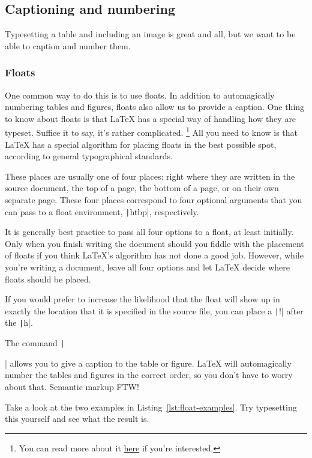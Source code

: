 \subsection{Captioning and numbering}
\label{subsec:captioning-and-numbering}

Typesetting a table and including an image is great and all, but we want to be able to caption and number them.

\subsubsection{Floats}
\label{subsubsec:floats}

One common way to do this is to use floats.
In addition to automagically numbering tables and figures, floats also allow us to provide a caption.
One thing to know about floats is that \LaTeX{} has a special way of handling how they are typeset.
Suffice it to say, it's rather complicated.%
\footnote{%
You can read more about it \href{http://tex.stackexchange.com/q/39017/32888}{here} if you're interested.%
}
All you need to know is that \LaTeX{} has a special algorithm for placing floats in the best possible spot, according to general typographical standards.

These places are usually one of four places: right where they are written in the source document, the top of a page, the bottom of a page, or on their own separate page.
These four places correspond to four optional arguments that you can pass to a float environment, \texttt|htbp|, respectively.

It is generally best practice to pass all four options to a float, at least initially.
Only when you finish writing the document should you fiddle with the placement of floats if you think \LaTeX's algorithm has not done a good job.
However, while you're writing a document, leave all four options and let \LaTeX{} decide where floats should be placed.

If you would prefer to increase the likelihood that the float will show up in exactly the location that it is specified in the source  file, you can place a \texttt|!| after the \texttt|h|.

The command \texttt|\caption{}| allows you to give a caption to the table or figure.
\LaTeX{} will automagically number the tables and figures in the correct order, so you don't have to worry about that.
Semantic markup FTW!

Take a look at the two examples in Listing~\ref{lst:float-examples}.
Try typesetting this yourself and see what the result is.

